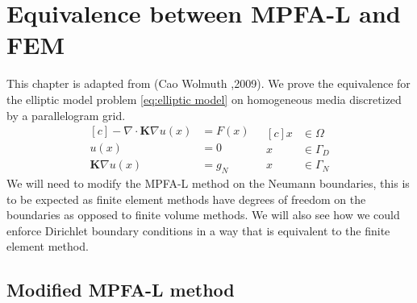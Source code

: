\documentclass[../Main/main.tex]{subfiles}
\begin{document}
	\graphicspath{{../Equivalence between MPFA-L and FEM/figs/}}
	\chapter{Equivalence between MPFA-L and FEM}
		This chapter is adapted from (Cao Wolmuth \cite{https://doi.org/10.1002/num.20525},2009).
		We prove the equivalence for the elliptic model problem \eqref{eq:elliptic model} on homogeneous media discretized by a parallelogram grid.
	\begin{equation}\label{eq:elliptic model 2}
		\begin{aligned}[c]
			- \nabla \cdot \pmb{K} \nabla u(x) &= F(x) \\
			u(x) &= 0 \\
			\pmb{K}\nabla u(x) &= g_N
		\end{aligned}
		\ \ \
		\begin{aligned}[c]
			x &\in \Omega  \\
			x &\in \Gamma_D \\
			x &\in \Gamma_N
		\end{aligned}
	\end{equation}	
	We will need to modify the MPFA-L method on the Neumann boundaries, this is to be expected as finite element methods have degrees of freedom on the boundaries as opposed to finite volume methods. We will also see how we could enforce Dirichlet boundary conditions in a way that is equivalent to the finite element method.

	\section*{Modified MPFA-L method}
\end{document}
